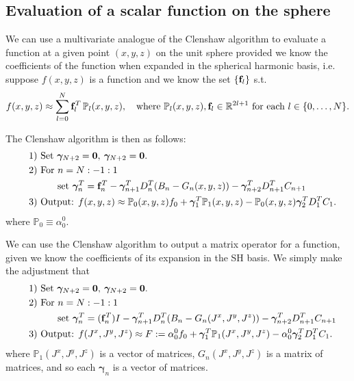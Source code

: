 \documentclass[11pt, oneside]{article}   	%
\newcommand{\R}{\mathbb{R}}
\newcommand{\bigP}{\mathbb{P}}
\newcommand{\Pl}{\mathbb{P}_l}
\begin{document}
\subsection{Evaluation of a scalar function on the sphere}
We can use a multivariate analogue of the Clenshaw algorithm to evaluate a function at a given point \((x,y,z)\) on the unit sphere provided we know the coefficients of the function when expanded in the spherical harmonic basis, i.e. suppose \(f(x,y,z)\) is a function and we know the set \(\{\bold{f}_l\}\) s.t.
\begin{align}
f(x,y,z) \approx \sum^N_{l=0} \bold{f}_l^T \, \Pl (x,y,z), \quad \text{where } \Pl (x,y,z), \bold{f}_l \in \R^{2l+1} \text{ for each } l \in \{0,\dots,N\}.
\end{align}

The Clenshaw algorithm is then as follows:
\begin{align*}
\quad &\text{1) } \text{Set } \bm{\gamma}_{N+2} = \bold{0}, \: \bm{\gamma}_{N+2} = \bold{0}. \\
\quad &\text{2) } \text{For } n = N:-1:1 \\
\quad & \quad \quad \quad \text{set } \bm{\gamma}_{n}^T = \bold{f}_n^T - \bm{\gamma}_{n+1}^T D^T_n (B_n - G_n(x,y,z)) -  \bm{\gamma}_{n+2}^T D^T_{n+1}C_{n+1} \\
\quad &\text{3) } \text{Output: } f(x,y,z) \approx \bigP_0(x,y,z) f_0 + \bm{\gamma}_{1}^T \bigP_1(x,y,z) - \bigP_0(x,y,z) \bm{\gamma}_{2}^T D^T_1 C_1.
\end{align*}
where $\bigP_0 \equiv \alpha^0_0$.

We can use the Clenshaw algorithm to output a matrix operator for a function, given we know the coefficients of its expansion in the SH basis. We simply make the adjustment that
\begin{align*}
\quad &\text{1) } \text{Set } \bm{\gamma}_{N+2} = \bold{0}, \: \bm{\gamma}_{N+2} = \bold{0}. \\
\quad &\text{2) } \text{For } n = N:-1:1 \\
\quad & \quad \quad \quad \text{set } \bm{\gamma}_{n}^T = (\bold{f}_n^T)I - \bm{\gamma}_{n+1}^T D^T_n (B_n - G_n(J^x,J^y,J^z)) -  \bm{\gamma}_{n+2}^T D^T_{n+1}C_{n+1} \\
\quad &\text{3) } \text{Output: } f(J^x,J^y,J^z) \approx F := \alpha^0_0 f_0 + \bm{\gamma}_{1}^T \bigP_1(J^x,J^y,J^z) - \alpha^0_0 \bm{\gamma}_{2}^T D^T_1 C_1.
\end{align*}
where $\bigP_1(J^x,J^y,J^z)$ is a vector of matrices, $G_n(J^x,J^y,J^z)$ is a matrix of matrices, and so each $\bm{\gamma}_n$ is a vector of matrices.
\end{document}
